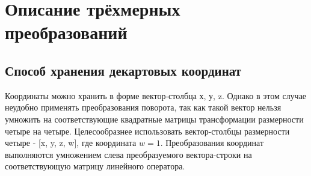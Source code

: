 \begin{center}
	\label{img:raycasting}
\end{center}
\section{Описание трёхмерных преобразований}
\subsection{Способ хранения декартовых координат }
Координаты можно хранить в форме вектор-столбца х, у, z. Однако в этом случае неудобно применять преобразования поворота, так как
такой вектор нельзя умножить на соответствующие квадратные матрицы
трансформации размерности четыре на четыре. Целесообразнее использовать вектор-столбцы размерности четыре - [x, y, z, w], где координата $w = 1$.
Преобразования координат выполняются умножением слева преобразуемого вектора-строки на соответствующую матрицу линейного оператора.

